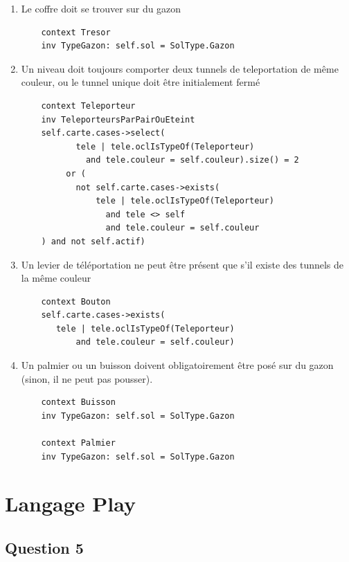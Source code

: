 \documentclass[11pt]{article}
\begin{document}
\begin{enumerate}
  \item Le coffre doit se trouver sur du gazon
  
  \begin{verbatim}
    context Tresor
    inv TypeGazon: self.sol = SolType.Gazon
  \end{verbatim}     
  
  \item  Un niveau doit toujours comporter deux tunnels de teleportation de même couleur, ou le tunnel unique doit être initialement fermé 
  
  \begin{verbatim}
    context Teleporteur
    inv TeleporteursParPairOuEteint
    self.carte.cases->select(
           tele | tele.oclIsTypeOf(Teleporteur)
             and tele.couleur = self.couleur).size() = 2
         or (
           not self.carte.cases->exists(
               tele | tele.oclIsTypeOf(Teleporteur)
                 and tele <> self
                 and tele.couleur = self.couleur
    ) and not self.actif)
  \end{verbatim}     
  
  \item Un levier de téléportation ne peut être présent que s'il existe des tunnels de la même couleur
  
  \begin{verbatim}
    context Bouton
    self.carte.cases->exists(
       tele | tele.oclIsTypeOf(Teleporteur)
           and tele.couleur = self.couleur)
  \end{verbatim}     
  
  \item Un palmier ou un buisson doivent obligatoirement être posé sur du gazon (sinon, il ne peut pas pousser).
  
  \begin{verbatim}
    context Buisson
    inv TypeGazon: self.sol = SolType.Gazon
    
    context Palmier
    inv TypeGazon: self.sol = SolType.Gazon
  \end{verbatim}     
  
\end{enumerate}

\section{Langage Play}

\subsection{Question 5}
\end{document}
